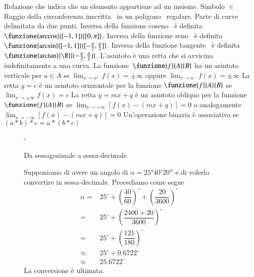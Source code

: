 Relazione che indica che un elemento appartiene ad un insieme. Simbolo $\in$
Raggio della circonferenza inscritta\pointsto~ in un poligono\pointsto~ regolare.
Parte di curve delimitata da due punti.
 Inversa della funzione coseno\pointsto~ è definita $\funzione{\arccos}{[-1,1]}{[0,\pi]}$. 
Inversa della funzione seno\pointsto~ è definita $\funzione{\arcsin}{[-1,1]}{[-\frac{\pi}{2},\frac{\pi}{2}]}$. 
Inversa della funzione tangente\pointsto~ è definita $\funzione{\arctan}{\R}{(-\frac{\pi}{2},\frac{\pi}{2})}$.
L'asintoto è una retta che si avvicina indefinitamente a una curva. 
La funzione\pointsto~$\funzione{f}{A}{B}$ ha un asintoto verticale per $a\in A$ se
$
\lim_{x\to a^+}f(x)=\pm\infty
$
oppure
$
\lim_{x\to a^-}f(x)=\pm\infty
$
La retta $y=c$ è un asintoto orizzontale per la funzione $\funzione{f}{A}{B}$ se $
\lim_{x\to\pm\infty}f(x)=c
$	
La retta $y=mx+q$ è un asintoto obliquo per la funzione $\funzione{f}{A}{B}$ se
$
\lim_{x\to +\infty}[f(x)-(mx+q)]=0
$
o analogamente
$
\lim_{x\to -\infty}[f(x)-(mx+q)]=0
$
Un'operazione binaria è associativa se 
$
(a*b)*c=a*(b*c)
$
\begin{figure}%
	\def\FrameCommand{\fboxsep=\FrameSep \colorbox{shadecolor}}%
	\begin{MakeFramed}{\advance\hsize-\width \FrameRestore}%
		\begin{center}%
			\textcolor{StrongGray}{\textsf{Da sessagesimale a sessa-decimale}}%
			\par%
			\vspace*{-\smallskipamount}%
			\vrule height 0.8pt width 56mm%
		\end{center}%
		\begin{small}%
		Supponiamo di avere un angolo di $\alpha=\ang{25;40;20}$ e di volerlo convertire in sessa-decimale. Procediamo come segue
		\begin{align*}
		\alpha=&25^{\circ}+\left(\dfrac{40}{60}\right)^{\circ}+\left(\dfrac{20}{3600}\right)^{\circ}\\
		=&25^{\circ}+\left(\dfrac{2400+20}{3600}\right)^{\circ}\\
		=&25^{\circ}+\left(\dfrac{121}{180}\right)^{\circ}\\
		\approx&25^{\circ}+0.6722^{\circ}\\
		\approx&25.6722^{\circ}
		\end{align*}
		La conversione è ultimata.
		\end{small}%
		\vspace*{-\smallskipamount}%
	\end{MakeFramed}%
\end{figure}%

